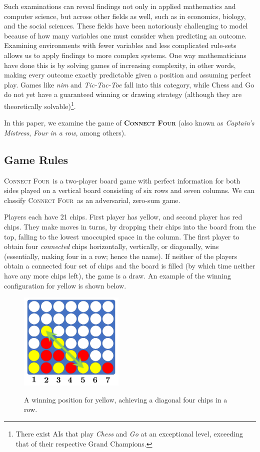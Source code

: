 \documentclass[12pt]{article}
\newcommand{\name}{\textsc{Connect Four}}
\begin{document}
Such examinations can reveal findings not only in applied mathematics and computer science, but across other fields as well, such as in economics, biology, and the social sciences.  These fields have been notoriously challenging to model because of how many variables one must consider when predicting an outcome.  Examining environments with fewer variables and less complicated rule-sets allows us to apply findings to more complex systems. One way mathematicians have done this is by solving games of increasing complexity, in other words, making every outcome exactly predictable given a position and assuming perfect play.  Games like \textit{nim} and \textit{Tic-Tac-Toe} fall into this category, while Chess and Go do not yet have a guaranteed winning or drawing strategy (although they are theoretically solvable)\footnote{There exist AIs that play \textit{Chess} and \textit{Go} at an exceptional level, exceeding that of their respective Grand Champions.}\cite{kdnuggets}.

In this paper, we examine the game of \textbf{\textsc{Connect Four}} (also known as \textit{Captain's Mistress}, \textit{Four in a row}, among others).

\subsection{Game Rules}
\name\ is a two-player board game with perfect information for both sides played on a vertical board consisting of six rows and seven columns. We can classify \name\ as an adversarial, zero-sum game.

Players each have 21 chips. First player has yellow, and second player has red chips.
They make moves in turns, by dropping their chips into the board from the top, falling to the lowest unoccupied space in the column. The first player to obtain four \textit{connected} chips horizontally, vertically, or diagonally, wins (essentially, making four in a row; hence the name). If neither of the players obtain a connected four set of chips and the board is filled (by which time neither have any more chips left), the game is a draw.
An example of the winning configuration for yellow is shown below.

\begin{figure}[h]
\centering
\includegraphics[width=5cm]{position-1.png}
\label{fig:sampleposition}
\caption{A winning position for yellow, achieving a diagonal four chips in a row.}
\end{figure}
\end{document}
